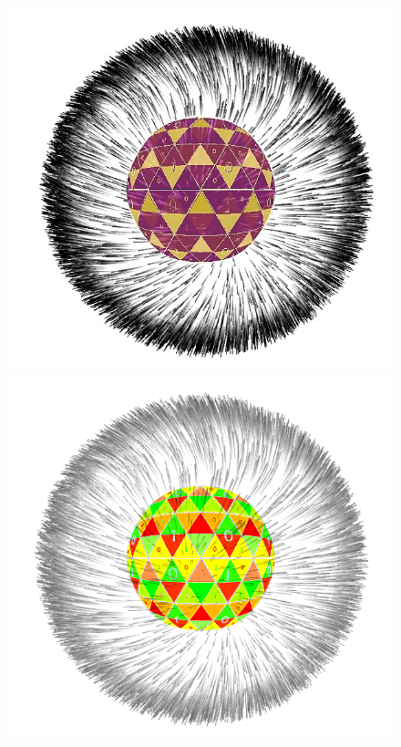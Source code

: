 \documentclass[11pt]{article}
\begin{document}
\begin{figure}[htp]
\centering
\includegraphics[scale=0.29]{./image/artee-0.jpg}
\includegraphics[scale=0.29]{./image/artee-1.png}
\caption{}
\label{}
\end{figure}
\end{document}
